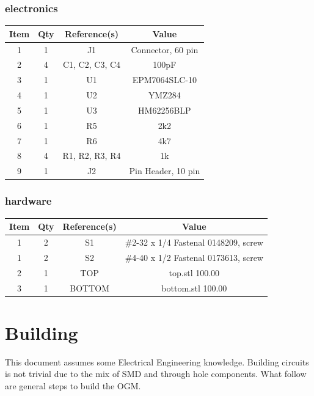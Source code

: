 \subsubsection{electronics}
\begin{footnotesize}
\begin{longtable}{ |*{4}{c|} }
\hline
{Item} & {Qty} & {Reference(s)} & {Value} \\
\hline
{1} & {1} & {J1} & {Connector, 60 pin} \\
\hline
{2} & {4} & {C1, C2, C3, C4} & {100pF} \\
\hline
{3} & {1} & {U1} & {EPM7064SLC-10} \\
\hline
{4} & {1} & {U2} & {YMZ284} \\
\hline
{5} & {1} & {U3} & {HM62256BLP} \\
\hline
{6} & {1} & {R5} & {2k2} \\
\hline
{7} & {1} & {R6} & {4k7} \\
\hline
{8} & {4} & {R1, R2, R3, R4} & {1k} \\
\hline
{9} & {1} & {J2} & {Pin Header, 10 pin} \\
\hline
\end{longtable}
\end{footnotesize}

\subsubsection{hardware}
\begin{footnotesize}
\begin{longtable}{ |*{4}{c|} }
\hline
{Item} & {Qty} & {Reference(s)} & {Value} \\
\hline
{1} & {2} & {S1} & {\#2-32 x 1/4 Fastenal 0148209, screw} \\
\hline
{1} & {2} & {S2} & {\#4-40 x 1/2 Fastenal 0173613, screw} \\
\hline
{2} & {1} & {TOP} & {top.stl 100.00} \\
\hline
{3} & {1} & {BOTTOM} & {bottom.stl 100.00} \\
\hline
\end{longtable}
\end{footnotesize}

\section{Building}

\par
This document assumes some Electrical Engineering knowledge. Building circuits is not
trivial due to the mix of SMD and through hole components. What follow are general
steps to build the OGM.

